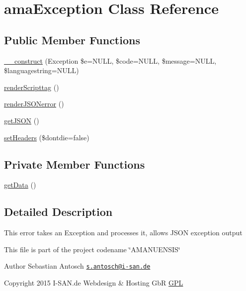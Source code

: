\hypertarget{classama_exception}{}\section{ama\+Exception Class Reference}
\label{classama_exception}
\subsection*{Public Member Functions}
\begin{DoxyCompactItemize}
\item 
\hyperlink{classama_exception_a4cbb6824ef0bc9a8d7bf88edac87cd7c}{\+\_\+\+\_\+construct} (Exception \$e=N\+U\+L\+L, \$code=N\+U\+L\+L, \$message=N\+U\+L\+L, \$languagestring=N\+U\+L\+L)
\item 
\hyperlink{classama_exception_a14cc1d72966a1d957beac76c396918fa}{render\+Scripttag} ()
\item 
\hyperlink{classama_exception_ad66ce26ace5f2cd20176981ce338e33b}{render\+J\+S\+O\+Nerror} ()
\item 
\hyperlink{classama_exception_a9d884d237da6c676af88b9c5bfbdc142}{get\+J\+S\+O\+N} ()
\item 
\hyperlink{classama_exception_a4d3f23834a02dec47b2188bf0b800377}{set\+Headers} (\$dontdie=false)
\end{DoxyCompactItemize}
\subsection*{Private Member Functions}
\begin{DoxyCompactItemize}
\item 
\hyperlink{classama_exception_a81a67162a6288d78fc4c55283325f0b4}{get\+Data} ()
\end{DoxyCompactItemize}


\subsection{Detailed Description}
This error takes an Exception and processes it, allows J\+S\+O\+N exception output

This file is part of the project codename \char`\"{}\+A\+M\+A\+N\+U\+E\+N\+S\+I\+S\char`\"{}

\begin{DoxyAuthor}{Author}
Sebastian Antosch \href{mailto:s.antosch@i-san.de}{\tt s.\+antosch@i-\/san.\+de} 
\end{DoxyAuthor}
\begin{DoxyCopyright}{Copyright}
2015 I-\/\+S\+A\+N.\+de Webdesign \& Hosting Gb\+R \hyperlink{}{G\+P\+L }
\end{DoxyCopyright}


